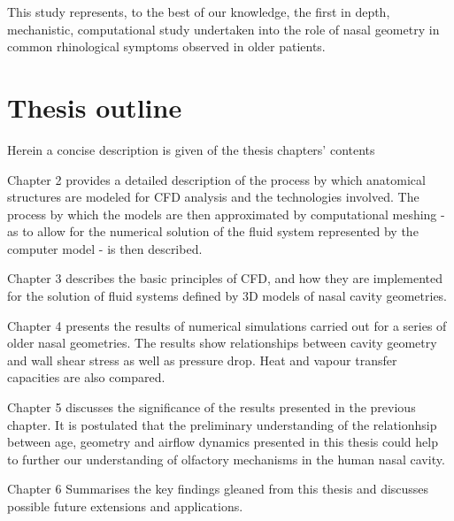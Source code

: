 This study represents, to the best of our knowledge, the first in depth, mechanistic, computational study undertaken into the role of nasal geometry in common rhinological symptoms observed in older patients.




\section{Thesis outline}

Herein a concise description is given of the thesis chapters' contents

\begin{description}
  \item{Chapter 2} provides a detailed description of the process by which anatomical structures are modeled for CFD analysis and the technologies involved. The process by which the models are then approximated by computational meshing - as to allow for the numerical solution of the fluid system represented by the computer model - is then described.

  \item{Chapter 3} describes the basic principles of CFD, and how they are implemented for the solution of fluid systems defined by 3D models of nasal cavity geometries.

  \item{Chapter 4} presents the results of numerical simulations carried out for a series of older nasal geometries. The results show relationships between cavity geometry and wall shear stress as well as pressure drop. Heat and vapour transfer capacities are also compared.

  \item{Chapter 5} discusses the significance of the results presented in the previous chapter. It is postulated that the preliminary understanding of the relationhsip between age, geometry and airflow dynamics presented in this thesis could help to further our understanding of  olfactory mechanisms in the human nasal cavity.

  \item{Chapter 6} Summarises the key findings gleaned from this thesis and discusses possible future extensions and applications.

\end{description}
